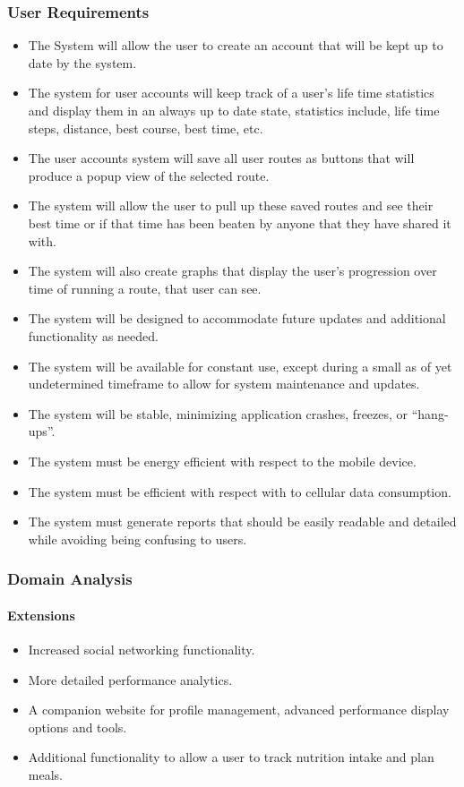 \documentclass{article}
\begin{document}
\subsubsection{User Requirements}
\begin{itemize}
    \item The System will allow the user to create an account that will be kept up to date by the system.
    \item The system for user accounts will keep track of a user's life time statistics and display them in an always up to date state, statistics include, life time steps, distance, best course, best time, etc.
    \item The user accounts system will save all user routes as buttons that will produce a popup view of the selected route.
    \item The system will allow the user to pull up these saved routes and see their best time or if that time has been beaten by anyone that they have shared it with.
    \item The system will also create graphs that display the user’s progression over time of running a route, that user can see.
    \item The system will be designed to accommodate future updates and additional functionality as needed.
    \item The system will be available for constant use, except during a small as of yet undetermined timeframe to allow for system maintenance and updates.
    \item The system will be stable, minimizing application crashes, freezes, or “hang-ups”.
    \item The system must be energy efficient with respect to the mobile device.
    \item The system must be efficient with respect with to cellular data consumption.
    \item The system must generate reports that should be easily readable and detailed while avoiding being confusing to users.

\end{itemize}

\subsubsection{Domain Analysis}
\paragraph{Extensions}
\begin{itemize}
    \item Increased social networking functionality.
    \item More detailed performance analytics.
    \item A companion website for profile management, advanced performance display options and tools.
    \item Additional functionality to allow a user to track nutrition intake and plan meals.
\end{itemize}
\end{document}
